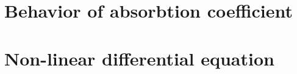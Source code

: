 \pagebreak
\section{Behavior of absorbtion coefficient}  %

\pagebreak
\section{Non-linear differential equation}  %

\pagebreak